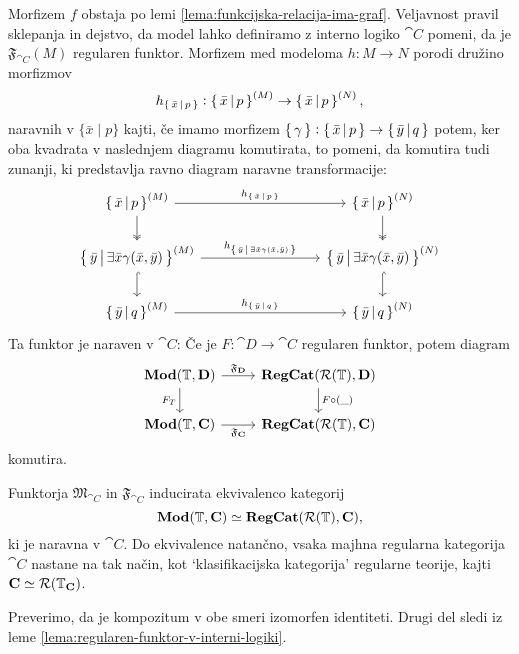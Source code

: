 \documentclass[../kategoricna_logika.tex]{subfiles}
\begin{document}
Morfizem $f$ obstaja po lemi \ref{lema:funkcijska-relacija-ima-graf}.
Veljavnost pravil sklepanja in dejstvo, da model lahko definiramo z
interno logiko $\cat{C}$ pomeni, da je $\mathfrak{F}_{\cat{C}}(M)$
regularen funktor.  Morfizem med modeloma $h : M \to N$ porodi družino
morfizmov
$$h_{\left\lbrace\,\bar{x}\,\middle|\, p\,\right\rbrace} : \left\lbrace\,\bar{x}\,\middle|\, p\,\right\rbrace^{(M)} \to \left\lbrace\,\bar{x}\,\middle|\, p\,\right\rbrace^{(N)},$$
naravnih v $\{\bar{x} \mid p\}$ kajti, če imamo morfizem
$\left\lbrace\,\gamma\,\right\rbrace : \left\lbrace\,\bar{x}\,\middle|\, p\,\right\rbrace \to
\left\lbrace\,\bar{y}\,\middle|\, q\,\right\rbrace$ potem, ker oba kvadrata v naslednjem
diagramu komutirata, to pomeni, da komutira tudi zunanji, ki
predstavlja ravno diagram naravne transformacije:
\begin{equation*}
  \begin{tikzcd}[column sep=3cm]
    \set{\bar{x}\,\middle|\, p}^{(M)} \ar[d, two heads] \ar[r, "h_{\set{\bar{x}\,\middle|\, p}}"] & \set{\bar{x}\,\middle|\, p}^{(N)} \ar[d, two heads] \\
    \set{\bar{y}\,\middle|\, \exists \bar{x} \gamma(\bar{x}, \bar{y})}^{(M)}  \ar[d, hook] \ar[r, "h_{\set{\bar{y}\,\middle|\, \exists \bar{x} \gamma(\bar{x}, \bar{y})}}"] & \set{\bar{y}\,\middle|\, \exists \bar{x} \gamma(\bar{x}, \bar{y})}^{(N)} \ar[d, hook] \\
    \set{\bar{y}\,\middle|\, q}^{(M)} \ar[r,
    "h_{\set{\bar{y}\,\middle|\, q}}"] & \set{\bar{y}\,\middle|\,
      q}^{(N)}
  \end{tikzcd}
\end{equation*}
Ta funktor je naraven v $\cat{C}$: Če je $F : \cat{D} \to \cat{C}$
regularen funktor, potem diagram
\begin{equation}
  \begin{tikzcd}
    \Mod(\T, \cat{D}) \ar[d, "F_T"'] \ar[r, "\mathfrak{F}_{\cat{D}}"] & \cat{RegCat}(\mathcal{R}(\T), \cat{D}) \ar[d, "F \circ (\_)"] \\
    \Mod(\T, \cat{C}) \ar[r, "\mathfrak{F}_{\cat{C}}"'] &
    \cat{RegCat}(\mathcal{R}(\T), \cat{C})
  \end{tikzcd}
\end{equation}
komutira.
\begin{izrek}
  Funktorja $\mathfrak{M}_{\cat{C}}$ in $\mathfrak{F}_{\cat{C}}$
  inducirata ekvivalenco kategorij
  $$\mathbf{Mod}(\mathbb{T}, {\operatorname{\mathbf{C}}}) \simeq {\operatorname{\mathbf{RegCat}}}(\mathcal{R}(\mathbb{T}), {\operatorname{\mathbf{C}}}),$$
  ki je naravna v $\cat{C}$. Do ekvivalence natančno, vsaka majhna
  regularna kategorija $\cat{C}$ nastane na tak način, kot
  `klasifikacijska kategorija' regularne teorije, kajti
  ${\operatorname{\mathbf{C}}} \simeq \mathcal{R}(\mathbb{T}_{{\operatorname{\mathbf{C}}}})$.
\end{izrek}
\begin{dokaz}
  Preverimo, da je kompozitum v obe smeri izomorfen identiteti. Drugi
  del sledi iz leme \ref{lema:regularen-funktor-v-interni-logiki}.
\end{dokaz}
\end{document}
